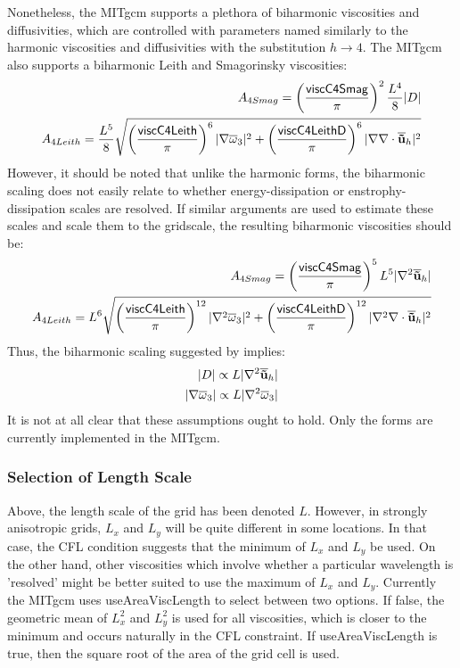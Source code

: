 Nonetheless, the MITgcm supports a plethora of biharmonic viscosities
and diffusivities, which are controlled with parameters named
similarly to the harmonic viscosities and diffusivities with the
substitution $h\rightarrow 4$.  The MITgcm also supports a biharmonic
Leith and Smagorinsky viscosities:
\begin{eqnarray}
A_{4Smag}=\left(\frac{{\sf viscC4Smag}}{\pi}\right)^2\frac{L^4}{8}|D|\nonumber\\
A_{4Leith}=\frac{L^5}{8}\sqrt{\left(\frac{{\sf viscC4Leith}}{\pi}\right)^6|\nabla \overline{\omega}_3|^2+\left(\frac{{\sf viscC4LeithD}}{\pi}\right)^6|\nabla \nabla\cdot \overline{\bf {\tilde u}}_h|^2}\nonumber
\end{eqnarray}
However, it should be noted that unlike the harmonic forms, the
biharmonic scaling does not easily relate to whether
energy-dissipation or enstrophy-dissipation scales are resolved.  If
similar arguments are used to estimate these scales and scale them to
the gridscale, the resulting biharmonic viscosities should be:
\begin{eqnarray}
A_{4Smag}=\left(\frac{{\sf viscC4Smag}}{\pi}\right)^5L^5|\nabla^2\overline{\bf {\tilde u}}_h|\nonumber\\
A_{4Leith}=L^6\sqrt{\left(\frac{{\sf viscC4Leith}}{\pi}\right)^{12}|\nabla^2 \overline{\omega}_3|^2+\left(\frac{{\sf viscC4LeithD}}{\pi}\right)^{12}|\nabla^2 \nabla\cdot \overline{\bf {\tilde u}}_h|^2}\nonumber
\end{eqnarray}
Thus, the biharmonic scaling suggested by \citet{grha00} implies:
\begin{eqnarray}
|D|\propto L|\nabla^2\overline{\bf {\tilde u}}_h|\\
|\nabla \overline{\omega}_3|\propto L|\nabla^2 \overline{\omega}_3|
\end{eqnarray}
It is not at all clear that these assumptions ought to hold.  Only the \citet{grha00} forms are currently implemented in the MITgcm.

\subsubsection{Selection of Length Scale}
Above, the length scale of the grid has been denoted $L$.  However, in
strongly anisotropic grids, $L_x$ and $L_y$ will be quite different in
some locations.  In that case, the CFL condition suggests that the
minimum of $L_x$ and $L_y$ be used.  On the other hand, other
viscosities which involve whether a particular wavelength is
'resolved' might be better suited to use the maximum of $L_x$ and
$L_y$.  Currently the MITgcm uses {\sf useAreaViscLength} to select
between two options.  If false, the geometric mean of $L^2_x$ and
$L^2_y$ is used for all viscosities, which is closer to the minimum
and occurs naturally in the CFL constraint.  If {\sf
  useAreaViscLength} is true, then the square root of the area of the
grid cell is used.

